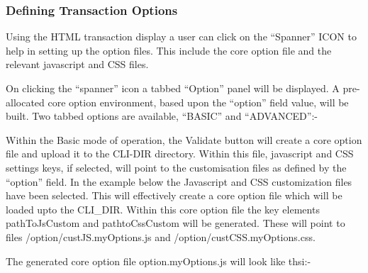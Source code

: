 \documentclass[letterpaper,10pt,english]{sphinxmanual}
\begin{document}
\subsubsection{Defining Transaction Options}
\label{\detokenize{User_Guide:defining-transaction-options}}
Using the HTML transaction display a user can click on the “Spanner” ICON to help in setting up the option files. This include the core option file and the relevant javascript and CSS files.


On clicking the “spanner” icon a tabbed “Option” panel will be displayed. A pre-allocated core option environment, based upon the “option” field value, will be built. Two tabbed options are available, “BASIC” and “ADVANCED”:-



Within the Basic mode of operation, the Validate button will create a core option file and upload it to the CLI-DIR directory. Within this file, javascript and CSS settings keys, if selected, will point to the customisation files as defined by the “option” field. In the example below the Javascript and CSS customization files have been selected. This will effectively create a core option file  which will be loaded upto the CLI\_DIR. Within this core option file the key elements pathToJsCustom and pathtoCssCustom will be generated. These will point to files /option/custJS.myOptions.js and /option/custCSS.myOptions.css.


The generated core option file option.myOptions.js will look like thsi:-

\begin{sphinxVerbatim}[commandchars=\\\{\}]
   
 
\end{sphinxVerbatim}
\end{document}
